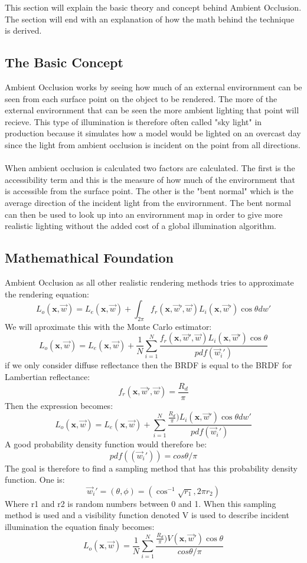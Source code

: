 This section will explain the basic theory and concept behind Ambient Occlusion. The section will end with an explanation of how the math behind the technique is derived.

\subsection{The Basic Concept}
Ambient Occlusion works by seeing how much of an external envirornment can be seen from each surface point on the object to be rendered. The more of the external envirornment that can be seen the more ambient lighting that point will recieve. This type of illumination is therefore often called "sky light" in production because it simulates how a model would be lighted on an overcast day since the light from ambient occlusion is incident on the point from all directions.
\\ \\
When ambient occlusion is calculated two factors are calculated. The first is the accessibility term and this is the measure of how much of the envirornment that is accessible from the surface point. The other is the "bent normal" which is the average direction of the incident light from the envirornment. The bent normal can then be used to look up into an envirornment map in order to give more realistic lighting without the added cost of a global illumination algorithm.
\subsection{Mathemathical Foundation}
Ambient Occlusion as all other realistic rendering methods tries to approximate the rendering equation:
\[ 
L_o(\textbf{x},\overrightarrow{w}) = 
L_e(\textbf{x},\overrightarrow{w}) +
\int_{2\pi}
 f_r(\textbf{x},\overrightarrow{w}',\overrightarrow{w} )L_i(\textbf{x},\overrightarrow{w}')\cos\theta dw'
\]
We will aproximate this with the Monte Carlo estimator:
\[ 
L_o(\textbf{x},\overrightarrow{w}) = 
L_e(\textbf{x},\overrightarrow{w}) +
\frac{1}{N}
\sum_{i=1}^N \frac{ 
 f_r(\textbf{x},\overrightarrow{w}',\overrightarrow{w} )L_i(\textbf{x},\overrightarrow{w}')\cos\theta
}
{
pdf(\overrightarrow{w}_i')
}
\]
if we only consider diffuse reflectance then the BRDF is equal to the BRDF for Lambertian reflectance:
\[
 f_r(\textbf{x},\overrightarrow{w}',\overrightarrow{w}) = \frac{R_d}{\pi}
\]
Then the expression becomes:
\[ 
L_o(\textbf{x},\overrightarrow{w}) = 
L_e(\textbf{x},\overrightarrow{w}) +
\sum_{i=1}^N \frac{ 
\frac{R_d}{\pi})L_i(\textbf{x},\overrightarrow{w}')\cos\theta dw'
}
{
pdf(\overrightarrow{w}_i')
}
\]
A good probability density function would therefore be:
\[
pdf((\overrightarrow{w}_i')) = cos\theta / \pi
\]
The goal is therefore to find a sampling method that has this probability density function. One is:
\[
\overrightarrow{w}_i' = (\theta,\phi) =
(\cos^{-1}\sqrt{r_1},2\pi r_2)
\]
Where r1 and r2 is random numbers between 0 and 1.
When this sampling method is used and a visibility function denoted V is used to describe incident illumination the equation finaly becomes:
\[ 
L_o(\textbf{x},\overrightarrow{w}) = 
\frac{1}{N}
\sum_{i=1}^N \frac{ 
\frac{R_d}{\pi})V(\textbf{x},\overrightarrow{w}')\cos\theta
}
{
cos\theta / \pi
}
\]

